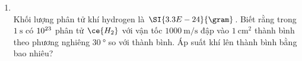 \begin{enumerate}[label=\bfseries Câu \arabic*:, leftmargin=1.7cm]
\item {}\\
Khối lượng phân tử khí hydrogen là $\SI{3.3E-24}{\gram}$. Biết rằng trong $\SI{1}{\second}$ có $\SI{E23}{}$ phân tử $\ce{H_2}$ với vận tốc $\SI{1000}{\meter/\second}$ đập vào $\SI{1}{\centi\meter^2}$ thành bình theo phương nghiêng $\SI{30}{\degree}$ so với thành bình. Áp suất khí lên thành bình bằng bao nhiêu?


\end{enumerate}
